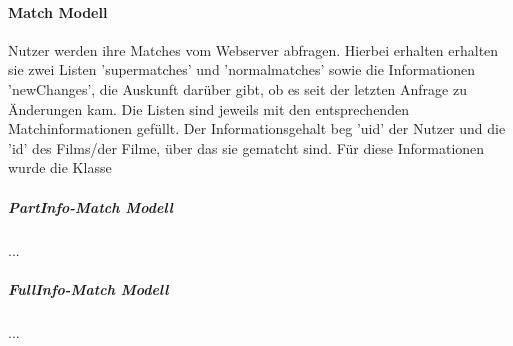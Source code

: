 \paragraph{Match Modell}
Nutzer werden ihre Matches vom Webserver abfragen. Hierbei erhalten erhalten sie zwei Listen 'supermatches' und 'normalmatches' sowie die Informationen 'newChanges', die Auskunft darüber gibt, ob es seit der letzten Anfrage zu Änderungen kam. Die Listen sind jeweils mit den entsprechenden Matchinformationen gefüllt. Der Informationsgehalt beg 'uid' der Nutzer und die 'id' des Films/der Filme, über das sie gematcht sind. Für diese Informationen wurde die Klasse 


\noindent
\subparagraph{PartInfo-Match Modell}
...

\noindent
\subparagraph{FullInfo-Match Modell}
...